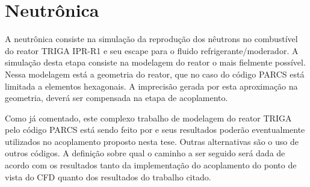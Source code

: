 \documentclass[12pt,openright,twoside,a4paper,english,french,spanish,brazil]{abntex2}
\begin{document}
\part{Neutrônica}

A neutrônica consiste na simulação da reprodução dos nêutrons no combustível do reator TRIGA IPR-R1 e seu escape 
para o fluido refrigerante/moderador. A simulação desta etapa consiste na modelagem do reator o mais fielmente 
possível. Nessa modelagem está a geometria do reator, que no caso do código PARCS está limitada a elementos 
hexagonais. A imprecisão gerada por esta aproximação na geometria, deverá ser compensada na etapa de acoplamento. 

Como já comentado, este complexo trabalho de modelagem do reator TRIGA pelo código PARCS está sendo 
feito por \cite{Reis2013} e seus resultados poderão eventualmente utilizados no acoplamento proposto 
nesta tese. Outras alternativas são o uso de outros códigos. A definição sobre qual o caminho a ser seguido 
será dada de acordo com os resultados tanto da implementação do acoplamento do ponto de vista do CFD 
quanto dos resultados do trabalho citado.
 


\end{document}
